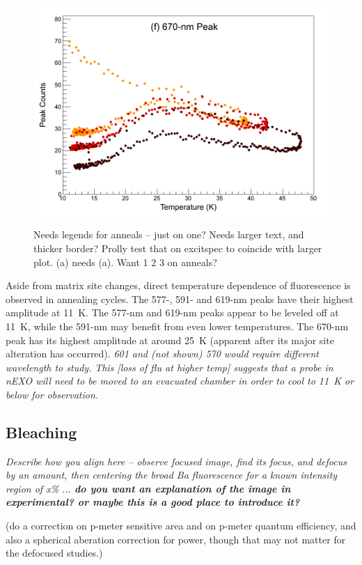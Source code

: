 \begin{figure}
                ~
                \includegraphics[width=.5\textwidth]{figures/anneal_670peak.png}
                \caption{\color{red}Needs legends for anneals -- just on one?  Needs larger text, and thicker border? Prolly test that on excitspec to coincide with larger plot.  (a) needs (a).  Want 1 2 3 on anneals?}
\label{fig:annealGrn}
\end{figure}

Aside from matrix site changes, direct temperature dependence of fluorescence is observed in annealing cycles.  The 577-, 591- and 619-nm peaks have their highest amplitude at 11~K.  The 577-nm and 619-nm peaks appear to be leveled off at 11~K, while the 591-nm may benefit from even lower temperatures.  The 670-nm peak has its highest amplitude at around 25~K (apparent after its major site alteration has occurred).  \emph{\color{gray}601 and (not shown) 570 would require different wavelength to study.} \emph{\color{gray}This [loss of flu at higher temp] suggests that a probe in nEXO will need to be moved to an evacuated chamber in order to cool to 11~K or below for observation.}


\subsection{Bleaching}
\label{subsec:bleaching}

\emph{\color{gray}Describe how you align here -- observe focused image, find its focus, and defocus by an amount, then centering the broad Ba fluorescence for a known intensity region of x\% ... \textbf{do you want an explanation of the image in experimental?  or maybe this is a good place to introduce it?}}

({\color{red}do a correction on p-meter sensitive area and on p-meter quantum efficiency, and also a spherical aberation correction for power, though that may not matter for the defocused studies.})

